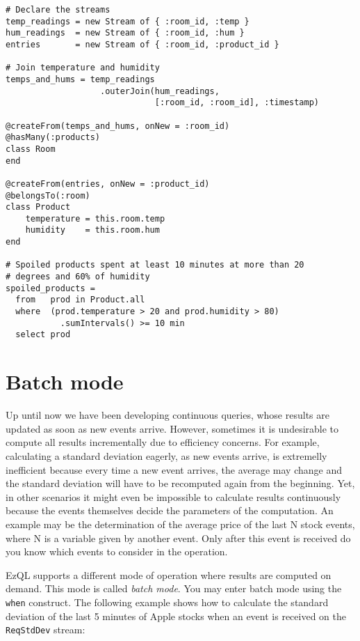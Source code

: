 \documentclass{report}
\begin{document}
\begin{verbatim}
# Declare the streams
temp_readings = new Stream of { :room_id, :temp }
hum_readings  = new Stream of { :room_id, :hum }
entries       = new Stream of { :room_id, :product_id }

# Join temperature and humidity
temps_and_hums = temp_readings
                   .outerJoin(hum_readings,
                              [:room_id, :room_id], :timestamp)

@createFrom(temps_and_hums, onNew = :room_id)
@hasMany(:products)
class Room
end

@createFrom(entries, onNew = :product_id)
@belongsTo(:room)
class Product
    temperature = this.room.temp
    humidity    = this.room.hum
end

# Spoiled products spent at least 10 minutes at more than 20
# degrees and 60% of humidity
spoiled_products =
  from   prod in Product.all
  where  (prod.temperature > 20 and prod.humidity > 80)
           .sumIntervals() >= 10 min
  select prod
\end{verbatim}

\chapter{Batch mode}

Up until now we have been developing continuous queries, whose results
are updated as soon as new events arrive. However, sometimes it is
undesirable to compute all results incrementally due to efficiency
concerns. For example, calculating a standard deviation eagerly, as
new events arrive, is extremelly inefficient because every time a new
event arrives, the average may change and the standard deviation will
have to be recomputed again from the beginning. Yet, in other
scenarios it might even be impossible to calculate results
continuously because the events themselves decide the parameters of
the computation. An example may be the determination of the average
price of the last N stock events, where N is a variable given by
another event. Only after this event is received do you know which
events to consider in the operation.

EzQL supports a different mode of operation where results are computed
on demand. This mode is called \emph{batch mode}. You may enter batch
mode using the \verb=when= construct. The following example shows how
to calculate the standard deviation of the last 5 minutes of Apple
stocks when an event is received on the \verb=ReqStdDev= stream:
\end{document}
